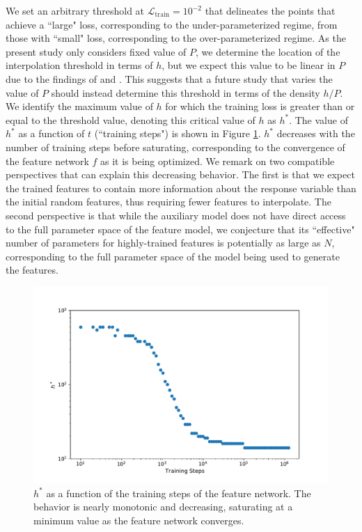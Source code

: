 \documentclass[11pt]{article}
\begin{document}
We set an arbitrary threshold at $\mathcal L_\text{train} = 10^{-2}$ that delineates the points that achieve a ``large" loss, corresponding to the under-parameterized regime, from those with ``small" loss, corresponding to the over-parameterized regime. As the present study only considers fixed value of $P$, we determine the location of the interpolation threshold in terms of $h$, but we expect this value to be linear in $P$ due to the findings of \cite{geigerJammingTransitionParadigm2019} and \cite{spiglerJammingTransitionOverparametrization2019}. This suggests that a future study that varies the value of $P$ should instead determine this threshold in terms of the density $h/P$. We identify the maximum value of $h$ for which the training loss is greater than or equal to the threshold value, denoting this critical value of $h$ as $h^*$. The value of $h^*$ as a function of $t$ (``training steps") is shown in Figure \ref{h^*_vs_t}. $h^*$ decreases with the number of training steps before saturating, corresponding to the convergence of the feature network $f$ as it is being optimized. We remark on two compatible perspectives that can explain this decreasing behavior. The first is that we expect the trained features to contain more information about the response variable than the initial random features, thus requiring fewer features to interpolate. The second perspective is that while the auxiliary model does not have direct access to the full parameter space of the feature model, we conjecture that its ``effective" number of parameters for highly-trained features is potentially as large as $N$, corresponding to the full parameter space of the model being used to generate the features.\\

\begin{figure}[!h]
\centering
\captionsetup{width=.8\linewidth}
\includegraphics[width=.8\linewidth]{docs/assets/h_star_vs_train_steps_L=1.pdf}
\caption{$h^*$ as a function of the training steps of the feature network. The behavior is nearly monotonic and decreasing, saturating at a minimum value as the feature network converges.}
\label{h^*_vs_t}
\end{figure}
\end{document}
